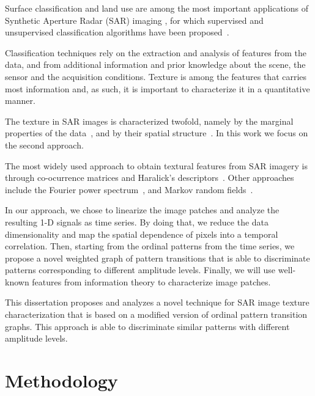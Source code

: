 \documentclass[paper=letter, fontsize=12pt]{article}
\begin{document}
Surface classification and land use are among the most important applications of Synthetic Aperture Radar (SAR) imaging \cite{Pottier2004Unsupervised}, for which supervised and unsupervised classification algorithms have been proposed~\cite{Chen1996multifrequency,Bhattacharya2018Unsupervised,ZYL1992Bayesian}.

Classification techniques rely on the extraction and analysis of features from the data, and from additional information and prior knowledge about  the scene, the sensor and the acquisition conditions.
Texture is among the features that carries most information and, as such, it is important to characterize it in a quantitative manner.

The texture in SAR images is characterized twofold, namely by the marginal properties of the data~\cite{adrian96}, and by their spatial structure~\cite{FeaturesCropDiscrimination}.
In this work we focus on the second approach.

The most widely used approach to obtain textural features from SAR imagery is through co-ocurrence matrices and Haralick's descriptors~\cite{Zakeri2017Texture}.
Other approaches include the Fourier power spectrum~\cite{Florindo2012Fractal}, and
Markov random fields~\cite{Deng2005UnsupervisedSO}.

In our approach, we chose to linearize the image patches and analyze the resulting 1-D signals as time series.
By doing that, we reduce the data dimensionality and map the spatial dependence of pixels into a temporal correlation.
Then, starting from the ordinal patterns from the time series, we propose a novel weighted graph of pattern transitions that is able to discriminate patterns corresponding to different amplitude levels.
Finally, we will use well-known features from information theory to characterize image patches.
	
This dissertation proposes and analyzes a novel technique for SAR image texture characterization that is based on a modified version of ordinal pattern transition graphs.
This approach is able to discriminate similar patterns with different amplitude levels. 
	
\section{Methodology}\label{methodology}
\end{document}
